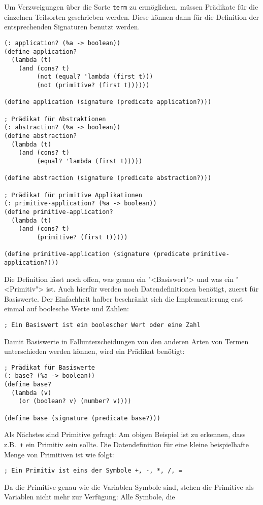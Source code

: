 Um Verzweigungen über die Sorte \texttt{term} zu ermöglichen, müssen
Prädikate für die einzelnen Teilsorten geschrieben werden.  Diese
können dann für die Definition der entsprechenden Signaturen benutzt
werden.
%
\begin{verbatim}
(: application? (%a -> boolean))
(define application?
  (lambda (t)
    (and (cons? t)
         (not (equal? 'lambda (first t)))
         (not (primitive? (first t))))))

(define application (signature (predicate application?)))

; Prädikat für Abstraktionen
(: abstraction? (%a -> boolean))
(define abstraction?
  (lambda (t)
    (and (cons? t)
         (equal? 'lambda (first t)))))

(define abstraction (signature (predicate abstraction?)))

; Prädikat für primitive Applikationen
(: primitive-application? (%a -> boolean))
(define primitive-application?
  (lambda (t)
    (and (cons? t)
         (primitive? (first t)))))

(define primitive-application (signature (predicate primitive-application?)))
\end{verbatim}
%
Die Definition lässt noch offen, was genau ein "<Basiswert"> und was ein
"<Primitiv"> ist.  Auch hierfür werden noch Datendefinitionen
benötigt, zuerst für Basiswerte.  Der Einfachheit halber beschränkt
sich die Implementierung erst einmal auf boolesche Werte und Zahlen:
%
\begin{verbatim}
; Ein Basiswert ist ein boolescher Wert oder eine Zahl
\end{verbatim}
%
Damit Basiswerte in Fallunterscheidungen von den anderen Arten von
Termen unterschieden werden können, wird ein Prädikat benötigt:
%
\begin{verbatim}
; Prädikat für Basiswerte
(: base? (%a -> boolean))
(define base?
  (lambda (v)
    (or (boolean? v) (number? v))))

(define base (signature (predicate base?)))
\end{verbatim}
%
Als Nächstes sind Primitive gefragt: Am obigen Beispiel ist zu
erkennen, dass z.B.\ \texttt{+} ein Primitiv sein sollte.  Die
Datendefinition für eine kleine beispielhafte Menge von Primitiven ist
wie folgt:
%
\begin{verbatim}
; Ein Primitiv ist eins der Symbole +, -, *, /, =
\end{verbatim}
%
Da die Primitive genau wie die Variablen Symbole sind, stehen die
Primitive als Variablen nicht mehr zur Verfügung:  Alle Symbole, die
